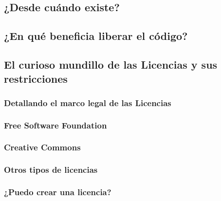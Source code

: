 \subsection{¿Desde cuándo existe?}

\subsection{¿En qué beneficia liberar el código?}

\subsection{El curioso mundillo de las Licencias y sus restricciones}

\subsubsection{Detallando el marco legal de las Licencias}

\subsubsection{Free Software Foundation}

\subsubsection{Creative Commons}

\subsubsection{Otros tipos de licencias}

\subsubsection{¿Puedo crear una licencia?}
